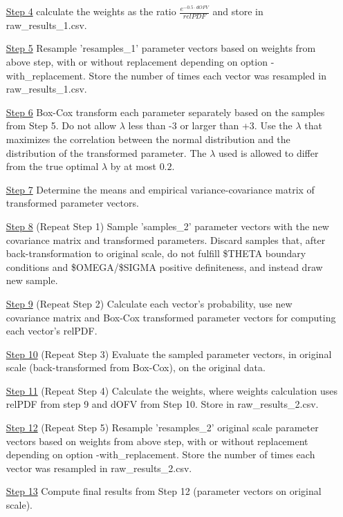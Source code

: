 \begin{itemize}
\item[\underline{Step 4}] calculate the weights as the ratio $\frac{e^{-0.5\cdot dOFV}}{relPDF}$ and store in 
raw\_results\_1.csv. 
\item[\underline{Step 5}] Resample 'resamples\_1' parameter vectors based on weights from above step, 
with or without replacement depending on option -with\_replacement. 
Store the number of times each vector was resampled in raw\_results\_1.csv.
\item[\underline{Step 6}] Box-Cox transform each parameter separately based on the samples from Step 5. Do not allow
$\lambda$ less than -3 or larger than +3. Use the $\lambda$ that maximizes the correlation between the normal distribution and
the distribution of the transformed parameter. The  $\lambda$ used is allowed to differ from the true optimal  $\lambda$
by at most $0.2$.
\item[\underline{Step 7}] Determine the means and empirical variance-covariance matrix of 
transformed parameter vectors.
\item[\underline{Step 8}] (Repeat Step 1) Sample 'samples\_2' parameter vectors 
with the new covariance matrix and transformed parameters.
Discard samples that, after back-transformation to original scale, do not
fulfill \$THETA boundary conditions and \$OMEGA/\$SIGMA positive definiteness, and instead draw new sample.
\item[\underline{Step 9}] (Repeat Step 2) Calculate each vector's probability, 
use new covariance matrix and Box-Cox transformed parameter vectors for computing each vector's relPDF.
\item[\underline{Step 10}] (Repeat Step 3) Evaluate the sampled parameter vectors, in original scale (back-transformed from Box-Cox), on the original data.
\item[\underline{Step 11}] (Repeat Step 4) Calculate the weights, 
where weights calculation uses relPDF from step 9 and dOFV from Step 10. 
Store in raw\_results\_2.csv. 
\item[\underline{Step 12}] (Repeat Step 5) Resample 'resamples\_2' original scale parameter vectors based on weights from above step, 
with or without replacement depending on option -with\_replacement. 
Store the number of times each vector was resampled in raw\_results\_2.csv.
\item[\underline{Step 13}] Compute final results from Step 12 (parameter vectors on original scale).
\end{itemize}



